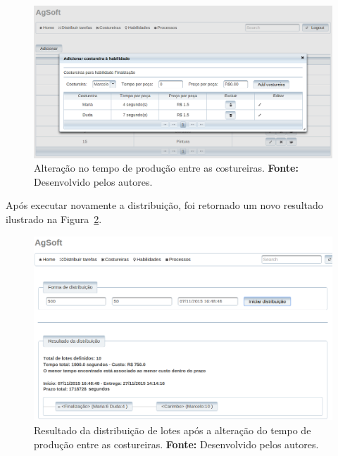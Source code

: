 \begin{figure}[h!]
	\centerline{\includegraphics[width=14cm]{./imagens/alterando_tempo_costureira.png}}
	\caption[Alteração no tempo de produção entre as costureiras.]
	{Alteração no tempo de produção entre as costureiras. \textbf{Fonte:}
	Desenvolvido pelos autores.}
	\label{fig:tempo_costureiras}
\end{figure}

\par Após executar novamente a distribuição, foi retornado um novo resultado
ilustrado na Figura~\ref{fig:novo_resultado_distribuicao_teste1}.



\begin{figure}[h!]
	\centerline{\includegraphics[width=14.7cm]{./imagens/novo_resultado_alterado_tempo_teste1.png}}
	\caption[Resultado da distribuição de lotes após a alteração do tempo de
	produção entre as costureiras.]
	{Resultado da distribuição de lotes após a alteração do tempo de
	produção entre as costureiras. \textbf{Fonte:} Desenvolvido pelos autores.}
	\label{fig:novo_resultado_distribuicao_teste1}
\end{figure}

